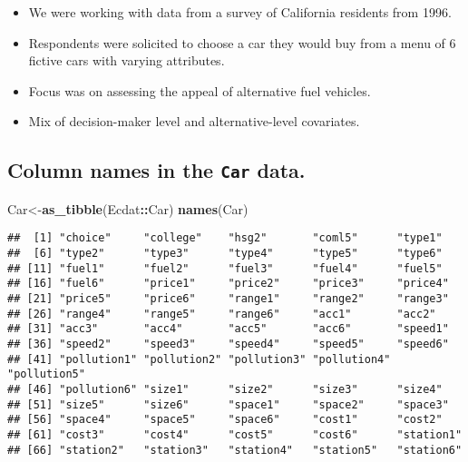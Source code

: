\documentclass[
  11pt,
]{article}
\newenvironment{Shaded}{\begin{snugshade}}{\end{snugshade}}
\newcommand{\FunctionTok}[1]{\textcolor[rgb]{0.13,0.29,0.53}{\textbf{#1}}}
\newcommand{\NormalTok}[1]{#1}
\newcommand{\OtherTok}[1]{\textcolor[rgb]{0.56,0.35,0.01}{#1}}
\newcommand{\SpecialCharTok}[1]{\textcolor[rgb]{0.81,0.36,0.00}{\textbf{#1}}}
\begin{document}
\begin{itemize}
\item
  We were working with data from a survey of California residents from
  1996.
\item
  Respondents were solicited to choose a car they would buy from a menu
  of 6 fictive cars with varying attributes.
\item
  Focus was on assessing the appeal of alternative fuel vehicles.
\item
  Mix of decision-maker level and alternative-level covariates.
\end{itemize}

\hypertarget{column-names-in-the-car-data.}{%
\subsection{\texorpdfstring{Column names in the \texttt{Car}
data.}{Column names in the Car data.}}\label{column-names-in-the-car-data.}}

\footnotesize

\begin{Shaded}
\begin{Highlighting}[]
\NormalTok{Car}\OtherTok{\textless{}{-}}\FunctionTok{as\_tibble}\NormalTok{(Ecdat}\SpecialCharTok{::}\NormalTok{Car)}
\FunctionTok{names}\NormalTok{(Car)}
\end{Highlighting}
\end{Shaded}

\begin{verbatim}
##  [1] "choice"     "college"    "hsg2"       "coml5"      "type1"     
##  [6] "type2"      "type3"      "type4"      "type5"      "type6"     
## [11] "fuel1"      "fuel2"      "fuel3"      "fuel4"      "fuel5"     
## [16] "fuel6"      "price1"     "price2"     "price3"     "price4"    
## [21] "price5"     "price6"     "range1"     "range2"     "range3"    
## [26] "range4"     "range5"     "range6"     "acc1"       "acc2"      
## [31] "acc3"       "acc4"       "acc5"       "acc6"       "speed1"    
## [36] "speed2"     "speed3"     "speed4"     "speed5"     "speed6"    
## [41] "pollution1" "pollution2" "pollution3" "pollution4" "pollution5"
## [46] "pollution6" "size1"      "size2"      "size3"      "size4"     
## [51] "size5"      "size6"      "space1"     "space2"     "space3"    
## [56] "space4"     "space5"     "space6"     "cost1"      "cost2"     
## [61] "cost3"      "cost4"      "cost5"      "cost6"      "station1"  
## [66] "station2"   "station3"   "station4"   "station5"   "station6"
\end{verbatim}
\end{document}
